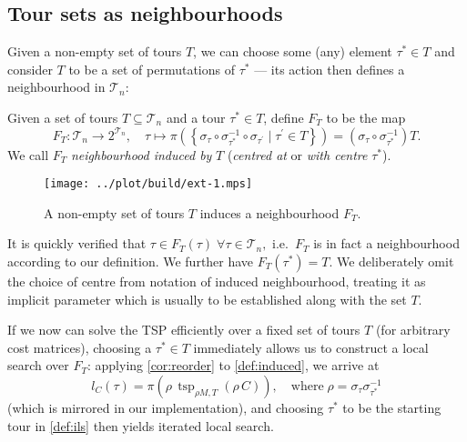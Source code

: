 \documentclass[index=totoc,bibliography=totoc]{scrartcl}
\numberwithin{equation}{section}
\numberwithin{figure}{section}
\numberwithin{table}{section}
\let\defstyle\itshape
\begin{document}
\subsection{Tour sets as neighbourhoods}

Given a non-empty set of tours $T$, we can choose some (any) element
$\tau^\ast \in T$ and consider $T$ to be a set of permutations of
$\tau^\ast$ --- its action then defines a neighbourhood in $\mathcal{T}_n$:

\begin{define}
  \label{def:induced}
  Given a set of tours $T \subseteq \mathcal{T}_n$ and a tour $\tau^\ast \in T$,
  define $F_T$ to be the map
  \[
    F_T: \mathcal{T}_n \to 2^{\mathcal{T}_n}, \quad
    \tau \mapsto
    \pi \left(
      \left\{ \sigma_{\tau} \circ \sigma_{\tau^\ast}^{-1} \circ \sigma_{\tau^\prime}
              \mid \tau^{\prime} \in T\right\}
    \right)
    =
      \left(\sigma_{\tau} \circ \sigma_{\tau^\ast}^{-1}\right) T.
  \]
  We call $F_T$ {\defstyle neighbourhood induced by} $T$
  ({\defstyle centred at} or {\defstyle with centre} $\tau^\ast$).
\end{define}

\begin{figure}[bht]
  \centering
  \texttt{[image: ../plot/build/ext-1.mps]}
  \caption{A non-empty set of tours $T$ induces a neighbourhood $F_T$.}
\end{figure}

\begin{remark}
  It is quickly verified that
  $\tau \in F_T\left(\tau\right) \; \forall \tau \in \mathcal{T}_n,$
  i.e.\ $F_T$ is in fact a neighbourhood according to our definition.
  We further have $F_T\left(\tau^\ast\right) = T$.
  We deliberately omit the choice of centre from notation of induced
  neighbourhood, treating it as implicit parameter which is usually
  to be established along with the set $T$.
\end{remark}

If we now can solve the TSP efficiently over a fixed set of tours $T$
(for arbitrary cost matrices), choosing a $\tau^\ast \in T$ immediately
allows us to construct a local search over $F_T$:
applying \cref{cor:reorder} to \cref{def:induced}, we arrive at
\[
  l_C\left(\tau\right) =
  \pi\left(\rho\,\operatorname{tsp}_{\rho M,T}\left(\rho\, C\right)\right),
  \quad
  \text{where}\; \rho = \sigma_\tau \sigma_{\tau^\ast}^{-1}
\]
(which is mirrored in our implementation),
and choosing $\tau^\ast$ to be the starting tour in \cref{def:ils} then
yields iterated local search.
%
%
%
\end{document}
